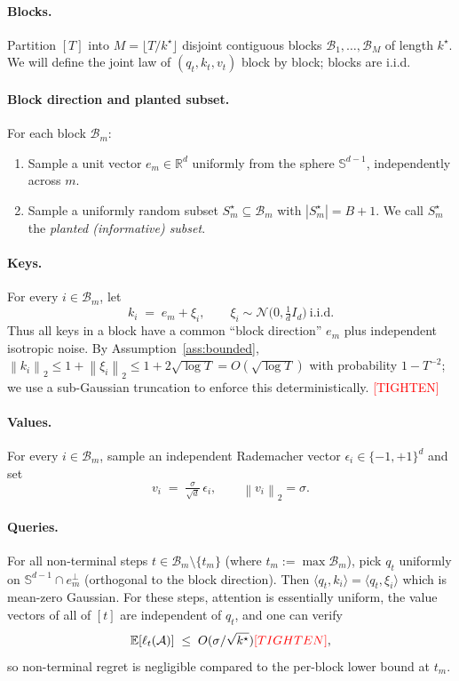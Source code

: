 \documentclass{article}
\theoremstyle{definition}
\theoremstyle{remark}
\newcommand{\R}{\mathbb{R}}
\newcommand{\E}{\mathbb{E}}
\newcommand{\A}{\mathcal{A}}
\newcommand{\Bset}{\mathcal{B}}
\newcommand{\inner}[2]{\langle #1, #2 \rangle}
\newcommand{\norm}[1]{\left\lVert #1 \right\rVert}
\newcommand{\tighten}{\textcolor{red}{[TIGHTEN]}}
\begin{document}
\paragraph{Blocks.}
Partition $[T]$ into $M=\lfloor T/k^\star\rfloor$ disjoint contiguous blocks $\Bset_1,\dots,\Bset_M$ of length $k^\star$. We will define the joint law of $(q_t,k_t,v_t)$ block by block; blocks are i.i.d.

\paragraph{Block direction and planted subset.}
For each block $\Bset_m$:
\begin{enumerate}
\item Sample a unit vector $e_m\in\R^d$ uniformly from the sphere $\mathbb S^{d-1}$, independently across $m$.
\item Sample a uniformly random subset $S_m^\star\subseteq\Bset_m$ with $|S_m^\star|=B+1$. We call $S_m^\star$ the \emph{planted (informative) subset}.
\end{enumerate}

\paragraph{Keys.}
For every $i\in\Bset_m$, let
\begin{equation}\label{eq:keys}
k_i \;=\; e_m + \xi_i,\qquad \xi_i\sim\mathcal N\bigl(0,\tfrac{1}{d}I_d\bigr)\ \text{i.i.d.}
\end{equation}
Thus all keys in a block have a common ``block direction'' $e_m$ plus independent isotropic noise. By Assumption~\ref{ass:bounded}, $\norm{k_i}_2\le 1+\norm{\xi_i}_2\le 1+2\sqrt{\log T}=O(\sqrt{\log T})$ with probability $1-T^{-2}$; we use a sub-Gaussian truncation to enforce this deterministically. \tighten

\paragraph{Values.}
For every $i\in\Bset_m$, sample an independent Rademacher vector $\epsilon_i\in\{-1,+1\}^d$ and set
\begin{equation}\label{eq:values}
v_i \;=\; \tfrac{\sigma}{\sqrt d}\,\epsilon_i, \qquad \norm{v_i}_2=\sigma.
\end{equation}

\paragraph{Queries.}
For all non-terminal steps $t\in\Bset_m\setminus\{t_m\}$ (where $t_m:=\max\Bset_m$), pick $q_t$ uniformly on $\mathbb S^{d-1}\cap e_m^{\perp}$ (orthogonal to the block direction). Then $\inner{q_t}{k_i}=\inner{q_t}{\xi_i}$ which is mean-zero Gaussian. For these steps, attention is essentially uniform, the value vectors of all of $[t]$ are independent of $q_t$, and one can verify
\begin{equation}\label{eq:nonterm-loss}
\E[\ell_t(\A)] \;\le\; O(\sigma/\sqrt{k^\star}) \tighten,
\end{equation}
so non-terminal regret is negligible compared to the per-block lower bound at $t_m$.
\end{document}
